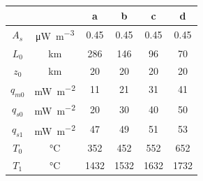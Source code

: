 \begin{tabular}{cccccc}
\toprule
& & a & b & c & d \\
\midrule
$A_{s}$ & \si{\uW\per\m\cubed} & 0.45 & 0.45 & 0.45 & 0.45 \\
$L_{0}$ & \si{\km} & 286 & 146 & 96 & 70 \\
$z_{0}$ & \si{\km} & 20 & 20 & 20 & 20 \\
\midrule
$q_{m0}$ & \si{\mW\per\m\squared} & 11 & 21 & 31 & 41 \\
$q_{s0}$ & \si{\mW\per\m\squared} & 20 & 30 & 40 & 50 \\
$q_{s1}$ & \si{\mW\per\m\squared} & 47 & 49 & 51 & 53 \\
$T_{0}$ & \si{\degreeCelsius} & 352 & 452 & 552 & 652 \\
$T_{1}$ & \si{\degreeCelsius} & 1432 & 1532 & 1632 & 1732 \\
\bottomrule
\end{tabular}
